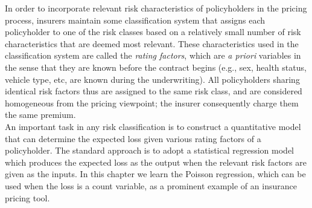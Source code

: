 \documentclass[12pt]{article}
\begin{document}
In order to incorporate relevant risk characteristics of policyholders in the pricing process, insurers maintain some classification system that assigns each policyholder to one of the risk classes based on a relatively small number of risk characteristics that are deemed most relevant. These characteristics used in the classification system are called the \textit{rating factors}, which are \textit{a priori} variables in the sense that they are known before the contract begins (e.g., sex, health status, vehicle type, etc, are known during the underwriting). All policyholders sharing identical risk factors thus are assigned to the same risk class, and are considered homogeneous from the pricing viewpoint; the insurer consequently charge them the same premium.\\

An important task in any risk classification is to construct a quantitative model that can determine the expected loss given various rating factors of a policyholder. The standard approach is to adopt a statistical regression model which produces the expected loss as the output when the relevant risk factors are given as the inputs. In this chapter we learn the Poisson regression, which can be used when the loss is a count variable, as a prominent example of an insurance pricing tool.

\end{document}
